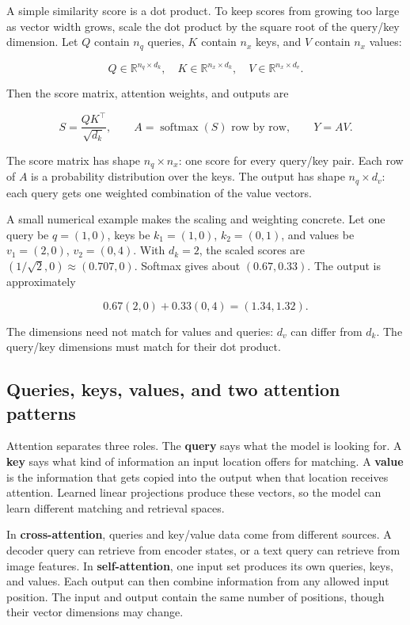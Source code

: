 A simple similarity score is a dot product. To keep scores from growing too large as vector width grows, scale the dot product by the square root of the query/key dimension. Let \(Q\) contain \(n_q\) queries, \(K\) contain \(n_x\) keys, and \(V\) contain \(n_x\) values:

\[
Q\in\mathbb{R}^{n_q\times d_k},\quad
K\in\mathbb{R}^{n_x\times d_k},\quad
V\in\mathbb{R}^{n_x\times d_v}.
\]

Then the score matrix, attention weights, and outputs are

\[
S=\frac{QK^\top}{\sqrt{d_k}},\qquad
A=\operatorname{softmax}(S)\text{ row by row},\qquad
Y=AV.
\]

The score matrix has shape \(n_q\times n_x\): one score for every query/key pair. Each row of \(A\) is a probability distribution over the keys. The output has shape \(n_q\times d_v\): each query gets one weighted combination of the value vectors.

A small numerical example makes the scaling and weighting concrete. Let one query be \(q=(1,0)\), keys be \(k_1=(1,0)\), \(k_2=(0,1)\), and values be \(v_1=(2,0)\), \(v_2=(0,4)\). With \(d_k=2\), the scaled scores are \((1/\sqrt2,0)\approx(0.707,0)\). Softmax gives about \((0.67,0.33)\). The output is approximately

\[
0.67(2,0)+0.33(0,4)=(1.34,1.32).
\]

The dimensions need not match for values and queries: \(d_v\) can differ from \(d_k\). The query/key dimensions must match for their dot product.

\subsection{Queries, keys, values, and two attention patterns}\label{04-visual-computing-ii-ch031-queries-keys-values-and-two-attention-patterns}

\hypertarget{04-visual-computing-ii-ch031-queries-keys-values-and-two-attention-patterns}{}

Attention separates three roles. The \textbf{query} says what the model is looking for. A \textbf{key} says what kind of information an input location offers for matching. A \textbf{value} is the information that gets copied into the output when that location receives attention. Learned linear projections produce these vectors, so the model can learn different matching and retrieval spaces.

In \textbf{cross-attention}, queries and key/value data come from different sources. A decoder query can retrieve from encoder states, or a text query can retrieve from image features. In \textbf{self-attention}, one input set produces its own queries, keys, and values. Each output can then combine information from any allowed input position. The input and output contain the same number of positions, though their vector dimensions may change.

